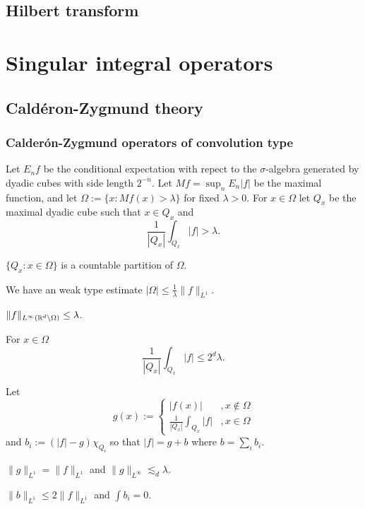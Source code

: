 \documentclass{../note}
\begin{document}
\chapter{Hilbert transform}




\part{Singular integral operators}
\chapter{Cald\'eron-Zygmund theory}


\section{Calder\'on-Zygmund operators of convolution type}
\begin{prb}
Let $E_nf$ be the conditional expectation with repect to the $\sigma$-algebra generated by dyadic cubes with side length $2^{-n}$.
Let $Mf=\sup_nE_n|f|$ be the maximal function, and let $\Omega:=\{x:Mf(x)>\lambda\}$ for fixed $\lambda>0$.
For $x\in\Omega$ let $Q_x$ be the maximal dyadic cube such that $x\in Q_x$ and
\[\frac1{|Q_x|}\int_{Q_x}|f|>\lambda.\]
\begin{parts}
\item
$\{Q_x:x\in\Omega\}$ is a countable partition of $\Omega$.
\item
We have an weak type estimate $|\Omega|\le\frac1\lambda\|f\|_{L^1}$.
\item
$\|f\|_{L^\infty(\mathbb{R}^d\setminus\Omega)}\le\lambda$.
\item
For $x\in\Omega$
\[\frac1{|Q_x|}\int_{Q_x}|f|\le2^d\lambda.\]
\end{parts}
\end{prb}

\begin{prb}
Let
\[g(x):=\begin{cases}|f(x)|&,x\notin\Omega\\\frac1{|Q_x|}\int_{Q_x}|f|&,x\in\Omega\end{cases}\]
and $b_i:=(|f|-g)\chi_{Q_i}$ so that $|f|=g+b$ where $b=\sum_ib_i$.
\begin{parts}
\item $\|g\|_{L^1}=\|f\|_{L^1}$ and $\|g\|_{L^\infty}\lesssim_d\lambda$.
\item $\|b\|_{L^1}\le2\|f\|_{L^1}$ and $\int b_i=0$.
\end{parts}
\end{prb}
\begin{pf}

\end{pf}
\end{document}

